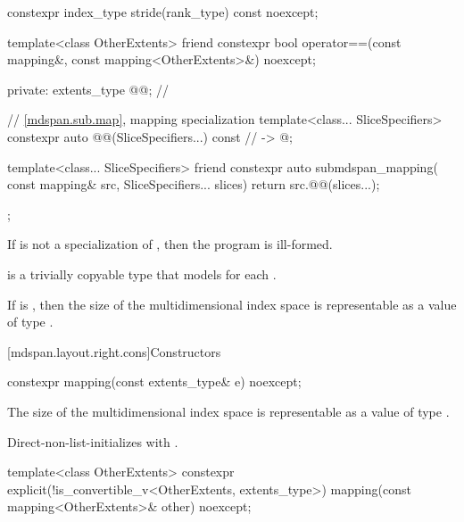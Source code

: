 \begin{codeblock}
{{    constexpr index_type stride(rank_type) const noexcept;

    template<class OtherExtents>
      friend constexpr bool operator==(const mapping&, const mapping<OtherExtents>&) noexcept;

  private:
    extents_type @@{};    // \expos

    // \ref{mdspan.sub.map},  mapping specialization
    template<class... SliceSpecifiers>
      constexpr auto @@(SliceSpecifiers...) const       // \expos
        -> @\seebelow@;

    template<class... SliceSpecifiers>
      friend constexpr auto submdspan_mapping(
        const mapping& src, SliceSpecifiers... slices) {
          return src.@@(slices...);
      }
  };
}
\end{codeblock}

\pnum
If  is not a specialization of ,
then the program is ill-formed.

\pnum
{} is a trivially copyable type
that models  for each .

\pnum
\mandates
If  is ,
then the size of the multidimensional index space 
is representable as a value of type .

[mdspan.layout.right.cons]{Constructors}

%
\begin{itemdecl}
constexpr mapping(const extents_type& e) noexcept;
\end{itemdecl}

\begin{itemdescr}
\pnum
\expects
The size of the multidimensional index space  is representable as
a value of type .

\pnum
\effects
Direct-non-list-initializes  with .
\end{itemdescr}

%
\begin{itemdecl}
template<class OtherExtents>
  constexpr explicit(!is_convertible_v<OtherExtents, extents_type>)
    mapping(const mapping<OtherExtents>& other) noexcept;
\end{itemdecl}

